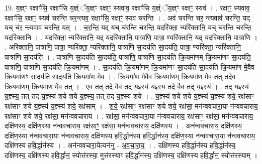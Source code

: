 \documentclass[17pt]{extarticle}
\begin{document}
19. य॒ज्ञ्ꣳ रक्षाꣳ॑सि॒ रक्षाꣳ॑सि य॒ज्ञ्ं ॅय॒ज्ञ्ꣳ रक्षाꣳ॒॒ स्यवाव॒ रक्षाꣳ॑सि य॒ज्ञ्ं ॅय॒ज्ञ्ꣳ रक्षाꣳ॒॒ स्यव॑ । . रक्षाꣳ॒॒ स्यवाव॒ रक्षाꣳ॑सि॒ रक्षाꣳ॒॒ स्यव॑ चरन्ति चर॒न्त्यव॒ रक्षाꣳ॑सि॒ रक्षाꣳ॒॒ स्यव॑ चरन्ति । . अव॑ चरन्ति चर॒ न्त्यवाव॑ चरन्ति॒ यद् यच् च॑र॒ न्त्यवाव॑ चरन्ति॒ यत् । . च॒र॒न्ति॒ यद् यच् च॑रन्ति चरन्ति॒ यदरि॑क्ता॒ न्यरि॑क्तानि॒ यच् च॑रन्ति चरन्ति॒ यदरि॑क्तानि । . यदरि॑क्ता॒ न्यरि॑क्तानि॒ यद् यदरि॑क्तानि॒ पात्रा॑णि॒ पात्रा॒ ण्यरि॑क्तानि॒ यद् यदरि॑क्तानि॒ पात्रा॑णि । . अरि॑क्तानि॒ पात्रा॑णि॒ पात्रा॒ ण्यरि॑क्ता॒ न्यरि॑क्तानि॒ पात्रा॑णि सा॒दय॑ति सा॒दय॑ति॒ पात्रा॒ ण्यरि॑क्ता॒ न्यरि॑क्तानि॒ पात्रा॑णि सा॒दय॑ति । . पात्रा॑णि सा॒दय॑ति सा॒दय॑ति॒ पात्रा॑णि॒ पात्रा॑णि सा॒दय॑ति क्रि॒यमा॑णम् क्रि॒यमा॑णꣳ सा॒दय॑ति॒ पात्रा॑णि॒ पात्रा॑णि सा॒दय॑ति क्रि॒यमा॑णम् । . सा॒दय॑ति क्रि॒यमा॑णम् क्रि॒यमा॑णꣳ सा॒दय॑ति सा॒दय॑ति क्रि॒यमा॑ण मे॒वैव क्रि॒यमा॑णꣳ सा॒दय॑ति सा॒दय॑ति क्रि॒यमा॑ण मे॒व । . क्रि॒यमा॑ण मे॒वैव क्रि॒यमा॑णम् क्रि॒यमा॑ण मे॒व तत् तदे॒व क्रि॒यमा॑णम् क्रि॒यमा॑ण मे॒व तत् । . ए॒व तत् तदे॒ वैव तद् य॒ज्ञ्स्य॑ य॒ज्ञ्स्य॒ तदे॒ वैव तद् य॒ज्ञ्स्य॑ । . तद् य॒ज्ञ्स्य॑ य॒ज्ञ्स्य॒ तत् तद् य॒ज्ञ्स्य॑ शये शये य॒ज्ञ्स्य॒ तत् तद् य॒ज्ञ्स्य॑ शये । . य॒ज्ञ्स्य॑ शये शये य॒ज्ञ्स्य॑ य॒ज्ञ्स्य॑ शये॒ रक्ष॑साꣳ॒॒ रक्ष॑साꣳ शये य॒ज्ञ्स्य॑ य॒ज्ञ्स्य॑ शये॒ रक्ष॑साम् । . श॒ये॒ रक्ष॑साꣳ॒॒ रक्ष॑साꣳ शये शये॒ रक्ष॑सा॒ मन॑न्ववचारा॒या न॑न्ववचाराय॒ रक्ष॑साꣳ शये शये॒ रक्ष॑सा॒ मन॑न्ववचाराय । . रक्ष॑सा॒ मन॑न्ववचारा॒या न॑न्ववचाराय॒ रक्ष॑साꣳ॒॒ रक्ष॑सा॒ मन॑न्ववचाराय॒ दक्षि॑णस्य॒ दक्षि॑ण॒स्या न॑न्ववचाराय॒ रक्ष॑साꣳ॒॒ रक्ष॑सा॒ मन॑न्ववचाराय॒ दक्षि॑णस्य । . अन॑न्ववचाराय॒ दक्षि॑णस्य॒ दक्षि॑ण॒स्या न॑न्ववचारा॒या न॑न्ववचाराय॒ दक्षि॑णस्य हवि॒र्द्धान॑स्य हवि॒र्द्धान॑स्य॒ दक्षि॑ण॒स्या न॑न्ववचारा॒या न॑न्ववचाराय॒ दक्षि॑णस्य हवि॒र्द्धान॑स्य । . अन॑न्ववचारा॒येत्यन॑नु - अ॒व॒चा॒रा॒य॒ । . दक्षि॑णस्य हवि॒र्द्धान॑स्य हवि॒र्द्धान॑स्य॒ दक्षि॑णस्य॒ दक्षि॑णस्य हवि॒र्द्धान॒ स्योत्त॑रस्या॒ मुत्त॑रस्याꣳ हवि॒र्द्धान॑स्य॒ दक्षि॑णस्य॒ दक्षि॑णस्य हवि॒र्द्धान॒ स्योत्त॑रस्याम् । \newline
\end{document}
